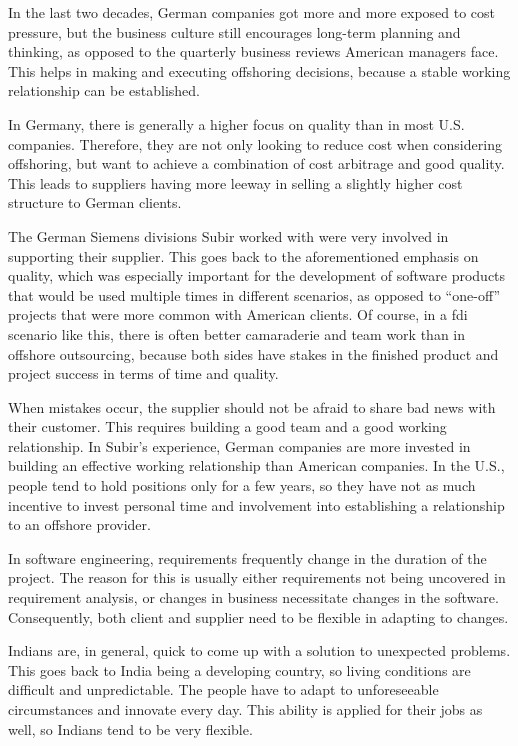 In the last two decades, German companies got more and more exposed to cost pressure, but the business culture still encourages long-term planning and thinking, as opposed to the quarterly business reviews American managers face. This helps in making and executing offshoring decisions, because a stable working relationship can be established.

In Germany, there is generally a higher focus on quality than in most U.S. companies. Therefore, they are not only looking to reduce cost when considering offshoring, but  want to achieve a combination of cost arbitrage and good quality. This leads to suppliers having more leeway in selling a slightly higher cost structure to German clients.

The German Siemens divisions Subir worked with were very involved in supporting their supplier. This goes back to the aforementioned emphasis on quality, which was especially important for the development of software products that would be used multiple times in different scenarios, as opposed to ``one-off'' projects that were more common with American clients. Of course, in a \gls{fdi} scenario like this, there is often better camaraderie and team work than in offshore outsourcing, because both sides have stakes in the finished product and project success in terms of time and quality.

When mistakes occur, the supplier should not be afraid to share bad news with their customer. This requires building a good team and a good working relationship. In Subir's experience, German companies are more invested in building an effective working relationship than American companies. In the U.S., people tend to hold positions only for a few years, so they have not as much incentive to invest personal time and involvement into establishing a relationship to an offshore provider.

In software engineering, requirements frequently change in the duration of the project. The reason for this is usually either requirements not being uncovered in requirement analysis, or changes in business necessitate changes in the software. Consequently, both client and supplier need to be flexible in adapting to changes.

Indians are, in general, quick to come up with a solution to unexpected problems. This goes back to India being a developing country, so living conditions are difficult and unpredictable. The people have to adapt to unforeseeable circumstances and innovate every day. This ability is applied for their jobs as well, so Indians tend to be very flexible.

